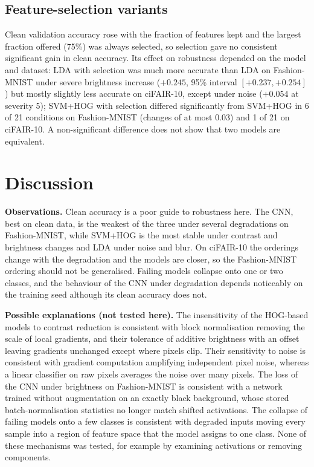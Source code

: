 \documentclass[conference]{IEEEtran}
\begin{document}
\subsection{Feature-selection variants}\label{sec:fs}
Clean validation accuracy rose with the fraction of features kept and the largest fraction offered (75\%) was always selected, so selection gave no consistent significant gain in clean accuracy. Its effect on robustness depended on the model and
dataset: LDA with selection was much more accurate than LDA on Fashion-MNIST under severe brightness increase ($+0.245$, 95\% interval $[+0.237,+0.254]$) but mostly slightly less accurate on ciFAIR-10, except under noise ($+0.054$ at severity 5);
SVM+HOG with selection differed significantly from SVM+HOG in 6 of 21 conditions on Fashion-MNIST (changes of at most 0.03) and 1 of 21 on ciFAIR-10. A non-significant difference does not show that two models are equivalent.

\section{Discussion}
\textbf{Observations.} Clean accuracy is a poor guide to robustness here. The CNN, best on clean data, is the weakest of the three under several degradations on Fashion-MNIST, while SVM+HOG is the most stable under contrast and
brightness changes and LDA under noise and blur. On ciFAIR-10 the orderings change with the degradation and the models are closer, so the Fashion-MNIST ordering should not be generalised. Failing models collapse onto one or two classes, and
the behaviour of the CNN under degradation depends noticeably on the training seed although its clean accuracy does not.

\textbf{Possible explanations (not tested here).} The insensitivity of the HOG-based models to contrast reduction is consistent with block normalisation removing the scale of local gradients, and their tolerance of additive brightness with an
offset leaving gradients unchanged except where pixels clip. Their sensitivity to noise is consistent with gradient computation amplifying independent pixel noise, whereas a linear classifier on raw pixels averages the noise over many pixels.
The loss of the CNN under brightness on Fashion-MNIST is consistent with a network trained without augmentation on an exactly black background, whose stored batch-normalisation statistics no longer match shifted activations. The collapse of failing
models onto a few classes is consistent with degraded inputs moving every sample into a region of feature space that the model assigns to one class. None of these mechanisms was tested, for example by examining activations or removing components.
\end{document}
